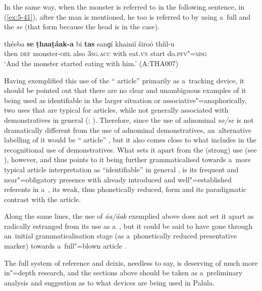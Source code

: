 In the same way, when the monster is referred to in the following sentence, in (\ref{ex:5-41}), after the man is mentioned, he too is referred to by using a~full  and the  \textit{se} (that form because the head is in the  case).
\begin{exe}
\ex
\label{ex:5-41}
\gll théeba \textbf{se} \textbf{ṭhaaṭáak-a} bi \textbf{tas} sanɡí khainií široó thíil-u\\
then \textsc{def} monster-\textsc{obl} also \textsc{3sg.acc} with eat.\textsc{vn} start do.\textsc{pfv"=msg}\\
\glt `And the monster started eating with him.' (A:THA007)
\end{exe}

Having exemplified this use of the `` article'' primarily as a~tracking device, it should be pointed out that there are no clear and unambiguous examples of it being used as identifiable in the larger situation or associative"=anaphorically, two uses that are typical for  articles, while not generally associated with demonstratives in general (\citealt[485]{juvonen2006}; \citealt[233]{himmelmann1996}). Therefore, since the use of adnominal \textit{so/se} is not dramatically different from the  use of adnominal demonstratives, an~alternative labelling of it would be `` article'' \citep[486]{juvonen2006}, but it also comes close to what \citet[230--239]{himmelmann1996} includes in the recognitional use of demonstratives. What sets it apart from the (strong)  use (see ), however, and thus points to it being further grammaticalised towards a~more typical  article interpretation as ``identifiable'' in general \citep[485]{juvonen2006}, is its frequent and near"=obligatory presence with already introduced and well"=established referents in a~, its weak, thus phonetically reduced, form and its paradigmatic contrast with the  article.


Along the same lines, the use of \textit{áa/áak} exemplied above does not set it apart as radically estranged from its use as a~, but it could be said to have gone through an~initial grammaticalisation stage (as a~phonetically reduced presentative marker) towards a~full"=blown  article \citep[486]{juvonen2006}.



The full system of reference and deixis, needless to say, is deserving of much more in"=depth research, and the sections above should be taken as a~preliminary analysis and suggestion as to what devices are being used in Palula.


